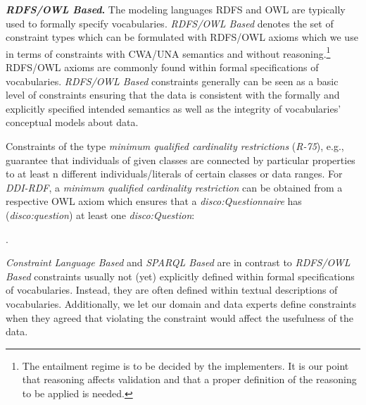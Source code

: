\documentclass[conference]{IEEEtran}
\newcommand{\ms}[1]{\texttt{#1}}
\begin{document}
\textbf{\emph{RDFS/OWL Based}.}
The modeling languages RDFS and OWL are typically used to formally specify vocabularies. \emph{RDFS/OWL Based} denotes the set of constraint types which can be formulated with RDFS/OWL axioms which we use in terms of constraints with CWA/UNA semantics and without reasoning.\footnote{The entailment regime is to be decided by the implementers. It is our point that reasoning affects validation and that a proper definition of the reasoning to be applied is needed.} RDFS/OWL axioms are commonly found within formal specifications of vocabularies. \emph{RDFS/OWL Based} constraints generally can be seen as a basic level of constraints ensuring that the data is consistent with the formally and explicitly specified intended semantics as well as the integrity of vocabularies' conceptual models about data.

Constraints of the type \emph{minimum qualified cardinality restrictions} (\emph{R-75}), e.g., guarantee that individuals of given classes are connected by particular properties to at least n different individuals/literals of certain classes or data ranges. For \emph{DDI-RDF}, a \emph{minimum qualified cardinality restriction} can be obtained from a respective OWL axiom which ensures that a \emph{disco:Questionnaire} has (\emph{disco:question}) at least one \emph{disco:Question}:
\begin{ex}
 .
\end{ex}


\emph{Constraint Language Based} and \emph{SPARQL Based} are in contrast to \emph{RDFS/OWL Based} constraints usually not (yet) explicitly defined within formal specifications of vocabularies. Instead, they are often defined within textual descriptions of vocabularies. Additionally, we let our domain and data experts define constraints when they agreed that violating the constraint would affect the usefulness of the data.
\end{document}

